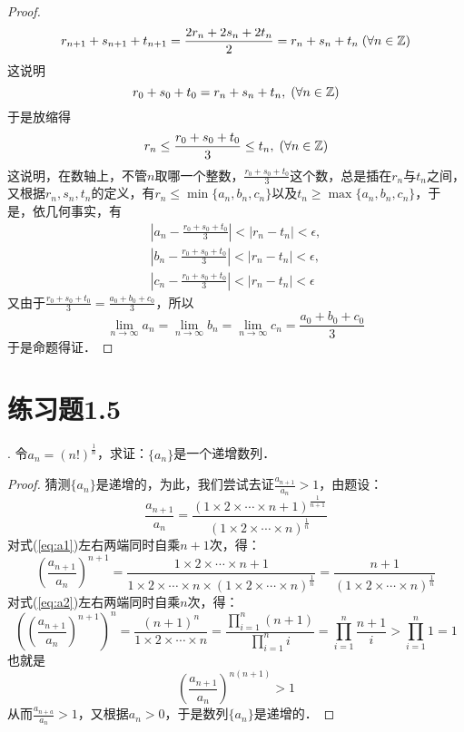 \begin{proof}
\begin{equation}
    r_{n+1}+s_{n+1}+t_{n+1} = \frac{2r_n+2s_n+2t_n}{2} = r_n + s_n + t_n \; (\forall n \in \mathbb{Z})
\end{equation}
这说明
\begin{equation}
    r_0+s_0+t_0=r_n+s_n+t_n, \; (\forall n \in \mathbb{Z})
\end{equation}
于是放缩得
\begin{equation}
    r_n \leq \frac{r_0+s_0+t_0}{3} \leq t_n, \; (\forall n \in \mathbb{Z})
\end{equation}
这说明，在数轴上，不管$n$取哪一个整数，$\displaystyle\frac{r_0+s_0+t_0}{3}$这个数，总是插在$r_n$与$t_n$之间，又根据$r_n,s_n,t_n$的定义，有$r_n \leq \min \{a_n,b_n,c_n\}$以及$t_n \geq \max \{a_n, b_n, c_n \}$，于是，依几何事实，有
\begin{align}
    |a_n - \frac{r_0+s_0+t_0}{3}| < |r_n - t_n| < \epsilon, \\
    |b_n - \frac{r_0+s_0+t_0}{3}| < |r_n - t_n| < \epsilon, \\
    |c_n - \frac{r_0+s_0+t_0}{3}| < |r_n - t_n| < \epsilon
\end{align}
又由于$\displaystyle\frac{r_0+s_0+t_0}{3}=\frac{a_0+b_0+c_0}{3}$，所以
\begin{equation}
    \lim_{n\to\infty} a_n = \lim_{n\to\infty} b_n = \lim_{n\to\infty} c_n = \frac{a_0+b_0+c_0}{3}
\end{equation}
于是命题得证．
\end{proof}


\section*{练习题1.5}
. 令$\displaystyle a_n = (n!)^\frac{1}{n}$，求证：$\{ a_n \}$是一个递增数列．
\begin{proof}
猜测$\{ a_n \}$是递增的，为此，我们尝试去证$\displaystyle \frac{a_{n+1}}{a_n} > 1$，由题设：
\begin{equation}
    \frac{a_{n+1}}{a_n} = \frac{(1 \times 2 \times \cdots \times n+1)^\frac{1}{n+1}}{(1 \times 2 \times \cdots \times n)^\frac{1}{n}}
    \label{eq:a1}
\end{equation}
对式(\ref{eq:a1})左右两端同时自乘$n+1$次，得：
\begin{equation}
    \left( \frac{a_{n+1}}{a_n} \right)^{n+1} = \frac{1 \times 2 \times \cdots \times n+1}{1 \times 2 \times \cdots \times n \times (1 \times 2 \times \cdots \times n)^\frac{1}{n}} = \frac{n+1}{(1 \times 2 \times \cdots \times n)^\frac{1}{n}}
    \label{eq:a2}
\end{equation}
对式(\ref{eq:a2})左右两端同时自乘$n$次，得：
\begin{equation}
    \left(\left(\frac{a_{n+1}}{a_n} \right)^{n+1}\right)^{n} = \frac{(n+1)^n}{1 \times 2 \times \cdots \times n} = \frac{\prod_{i=1}^{n} \left( n+1 \right) }{\prod_{i=1}^{n} i} = \prod_{i=1}^n \frac{n+1}{i} > \prod_{i=1}^{n} 1 = 1
\end{equation}
也就是
\begin{equation}
   \left( \frac{a_{n+1}}{a_n} \right)^{n (n+1)} > 1
\end{equation}
从而$\displaystyle \frac{a_{n+a}}{a_n} >1$，又根据$a_n > 0$，于是数列$\{ a_n \}$是递增的．
\end{proof}

